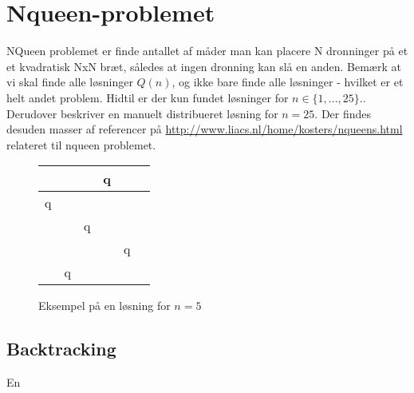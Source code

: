 \documentclass[final,a4paper,10pt]{article}
\def\chs#1{{\chessfont#1}}
\begin{document}
\section{Nqueen-problemet}\label{nqueenproblemet}

NQueen problemet er finde antallet af måder man kan placere N dronninger på et et kvadratisk NxN bræt, således at ingen dronning kan slå en anden. Bemærk at vi skal finde alle løsninger $Q(n)$, og ikke bare finde alle løsninger - hvilket er et helt andet problem. Hidtil er der kun fundet løsninger for $n \in \{1,...,25\}$.\cite{sekvenser}. Derudover beskriver \cite{etsi} en manuelt distribueret løsning for $n=25$. Der findes desuden masser af referencer på \url{http://www.liacs.nl/home/kosters/nqueens.html} relateret til nqueen problemet. 


\begin{figure}
\begin{center}
\begin{tabular}{|c|c|c|c|c|c}
\hline	 &  & &   \chs{q} & \\
\hline	\chs{q} & &  &  & \\
\hline	 & & \chs{q} &  &  \\
\hline	 &  &  & & \chs{q} \\
\hline	 & \chs{q} & &  &  \\
\hline
\end{tabular}
\end{center}
\caption{Eksempel på en løsning for $n=5$}
\end{figure}


\subsection{Backtracking}\label{backtracking}

En 


\end{document}
